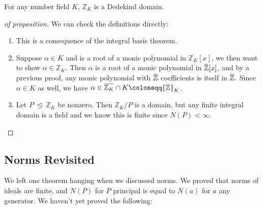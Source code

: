 \begin{proposition}

For any number field \(K\), \({\mathbb{Z}}_K\) is a Dedekind domain.

\end{proposition}

\begin{proof}[of proposition]

We can check the definitions directly:

\begin{enumerate}
\def\labelenumi{\alph{enumi}.}
\item
  This is a consequence of the integral basis theorem.
\item
  Suppose \(\alpha \in K\) and is a root of a monic polynomial in
  \({\mathbb{Z}}_K[x]\), we then want to show
  \(\alpha\in {\mathbb{Z}}_K\). Then \(\alpha\) is a root of a monic
  polynomial in
  \(\mkern 1.5mu\overline{\mkern-1.5mu{\mathbb{Z}}\mkern-1.5mu}\mkern 1.5mu[x]\),
  and by a previous proof, any monic polynomial with
  \(\mkern 1.5mu\overline{\mkern-1.5mu{\mathbb{Z}}\mkern-1.5mu}\mkern 1.5mu\)
  coefficients is itself in
  \(\mkern 1.5mu\overline{\mkern-1.5mu{\mathbb{Z}}\mkern-1.5mu}\mkern 1.5mu\).
  Since \(\alpha \in K\) as well, we have
  \(\alpha\in \mkern 1.5mu\overline{\mkern-1.5mu{\mathbb{Z}}_K\mkern-1.5mu}\mkern 1.5mu \cap K \coloneqq{\mathbb{Z}}_K\).
\item
  Let \(P {~\trianglelefteq~}{\mathbb{Z}}_K\) be nonzero. Then
  \({\mathbb{Z}}_K/P\) is a domain, but any finite integral domain is a
  field and we know this is finite since \(N(P) < \infty\).
\end{enumerate}

\end{proof}

\hypertarget{norms-revisited}{%
\subsection{Norms Revisited}\label{norms-revisited}}

\begin{remark}

We left one theorem hanging when we discussed norms. We proved that
norms of ideals are finite, and \(N(P)\) for \(P\) principal is equal to
\(N(a)\) for \(a\) any generator. We haven't yet proved the following:

\end{remark}

